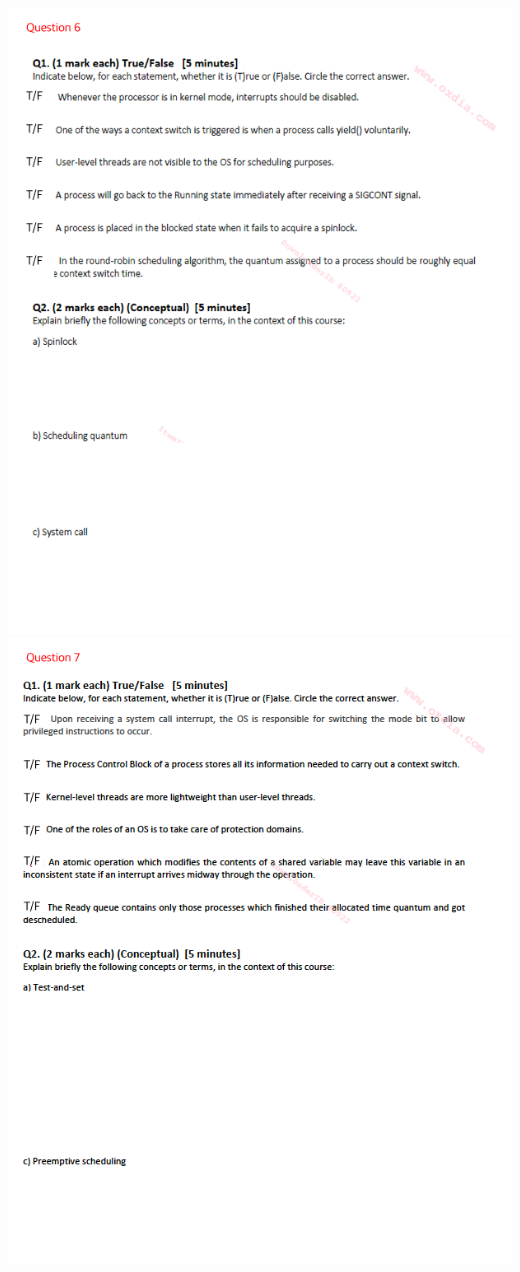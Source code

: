 \documentclass[12pt]{article}
\begin{document}
\begin{center}
    \includegraphics[width=\linewidth]{../../images/midterm_5_6.png}
    \includegraphics[width=\linewidth]{../../images/midterm_5_7.png}

\end{center}
\end{document}
